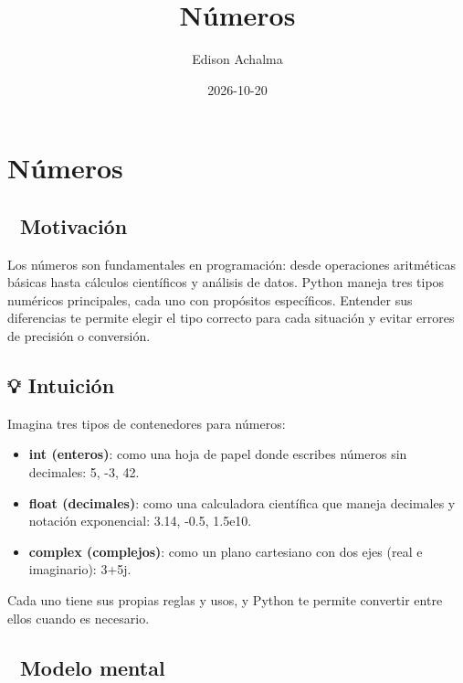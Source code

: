 \documentclass[
  doc,
  floatsintext,
  longtable,
  a4paper,
  nolmodern,
  notxfonts,
  notimes,
  12pt,
  colorlinks=true,linkcolor=blue,citecolor=blue,urlcolor=blue]{apa7}
\title{Números}
\author{Edison Achalma}
\affiliation{
{Escuela Profesional de Economía, Universidad Nacional de San Cristóbal
de Huamanga}}
\date{2026-10-20}
\providecommand{\tightlist}{%
  \setlength{\itemsep}{0pt}\setlength{\parskip}{0pt}}
\begin{document}
\maketitle


\hypertarget{toc}{}
\tableofcontents
\newpage
\section[Introduction]{Números}

\setcounter{secnumdepth}{3}

\setlength\LTleft{0pt}




\subsection{🎯 Motivación}\label{motivaciuxf3n}

Los números son fundamentales en programación: desde operaciones
aritméticas básicas hasta cálculos científicos y análisis de datos.
Python maneja tres tipos numéricos principales, cada uno con propósitos
específicos. Entender sus diferencias te permite elegir el tipo correcto
para cada situación y evitar errores de precisión o conversión.

\subsection{💡 Intuición}\label{intuiciuxf3n}

Imagina tres tipos de contenedores para números:

\begin{itemize}
\tightlist
\item
  \textbf{int (enteros)}: como una hoja de papel donde escribes números
  sin decimales: 5, -3, 42.
\item
  \textbf{float (decimales)}: como una calculadora científica que maneja
  decimales y notación exponencial: 3.14, -0.5, 1.5e10.
\item
  \textbf{complex (complejos)}: como un plano cartesiano con dos ejes
  (real e imaginario): 3+5j.
\end{itemize}

Cada uno tiene sus propias reglas y usos, y Python te permite convertir
entre ellos cuando es necesario.

\subsection{🧠 Modelo mental}\label{modelo-mental}
\end{document}

